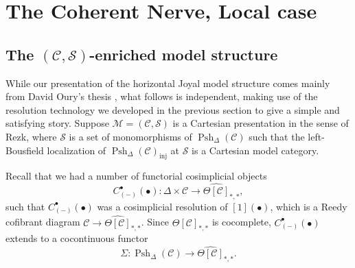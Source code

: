 \documentclass[a4paper]{article}
\numberwithin{equation}{subsection}
\theoremstyle{plain}   %
\theoremstyle{definition}
\theoremstyle{remark}
\theoremstyle{plain}
\providecommand{\C}{}
\renewcommand{\C}{\ensuremath{\mathcal{C}}}
\newcommand{\M}{\ensuremath{\mathcal{M}}}
\newcommand{\setS}{\ensuremath{\mathscr{S}}}
\newcommand{\cellset}{\ensuremath{\widehat{\Theta[\mathcal{C}]}}}
\newcommand{\spsh}{\ensuremath{\operatorname{Psh}_\Delta(\mathcal{C})}}
\begin{document}
\section{The Coherent Nerve, Local case}
\subsection{The \((\C,\setS)\)-enriched model structure}\label{rezkvert}
While our presentation of the horizontal Joyal model structure comes mainly from David Oury's thesis \cite{oury}, what follows is independent, making use of the resolution technology we developed in the previous section to give a simple and satisfying story. Suppose \(\M=(\C,\setS)\) is a Cartesian presentation in the sense of Rezk, where \(\setS\) is a set of monomorphisms of \(\spsh\) such that the left-Bousfield localization of \(\spsh_\mathrm{inj}\) at \(\setS\) is a Cartesian model category.  

Recall that we had a number of functorial cosimplicial objects \[C_{(-)}^\bullet(\bullet):\Delta \times \C \to \cellset_{\ast,\ast},\] such that \(C_{(-)}^\bullet(\bullet)\) was a cosimplicial resolution of \([1](\bullet)\), which is a Reedy cofibrant diagram \(\C\to \cellset_{\ast,\ast}\).  Since \(\cellset_{\ast,\ast}\) is cocomplete, \(C_{(-)}^\bullet(\bullet)\) extends to a cocontinuous functor \[\Sigma:\spsh\to \cellset_{\ast,\ast}.\]  
\end{document}
